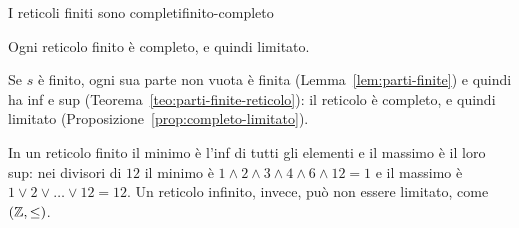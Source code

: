 \begin{concetto}
\begin{Corollario}{I reticoli finiti sono completi}{finito-completo}
    \begin{prerequisiti}
    \end{prerequisiti}
    Ogni reticolo finito è completo, e quindi limitato.
\end{Corollario}
\begin{dimostrazione}
    Se $s$ è finito, ogni sua parte non vuota è finita (Lemma~\ref{lem:parti-finite}) e quindi ha inf e sup (Teorema~\ref{teo:parti-finite-reticolo}): il reticolo è
    completo, e quindi limitato (Proposizione~\ref{prop:completo-limitato}).
\end{dimostrazione}
\end{concetto}

\begin{spiegazione}
    In un reticolo finito il minimo è l'inf di tutti gli elementi e il massimo è il loro sup: nei divisori di $12$ il minimo è
    $1 \wedge 2 \wedge 3 \wedge 4 \wedge 6 \wedge 12 = 1$ e il massimo è $1 \vee 2 \vee \dots \vee 12 = 12$. Un reticolo infinito, invece, può non essere limitato,
    come $(\mathbb{Z}, \leq)$.
\end{spiegazione}

